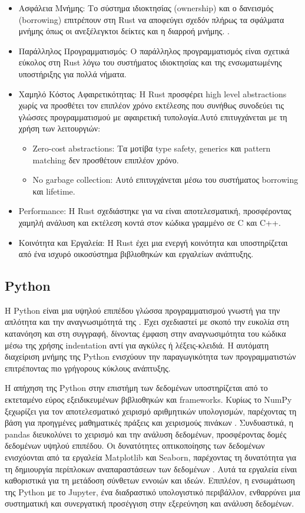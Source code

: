 \begin{itemize}
\item Ασφάλεια Μνήμης: Το σύστημα ιδιοκτησίας (ownership) και ο δανεισμός (borrowing) επιτρέπουν στη Rust να αποφεύγει σχεδόν πλήρως τα σφάλματα μνήμης όπως οι ανεξέλεγκτοι δείκτες και η διαρροή μνήμης. \cite{rust1}.
\item Παράλληλος Προγραμματισμός: Ο παράλληλος προγραμματισμός είναι σχετικά εύκολος στη Rust λόγω του συστήματος ιδιοκτησίας και της ενσωματωμένης υποστήριξης για πολλά νήματα.
\item Χαμηλό Κόστος Αφαιρετικότητας: Η Rust προσφέρει high level abstractions χωρίς να προσθέτει τον επιπλέον χρόνο εκτέλεσης που συνήθως συνοδεύει τις γλώσσες προγραμματισμού με αφαιρετική τυπολογία.Αυτό επιτυγχάνεται με τη χρήση των λειτουργιών:
\begin{itemize}
    \item Zero-cost abstractions: Τα μοτίβα type safety, generics και pattern matching δεν προσθέτουν επιπλέον χρόνο.
    \item No garbage collection: Αυτό επιτυγχάνεται μέσω του συστήματος borrowing και lifetime.
\end{itemize}
\item Performance: Η Rust σχεδιάστηκε για να είναι αποτελεσματική, προσφέροντας χαμηλή ανάλυση και εκτέλεση κοντά στον κώδικα γραμμένο σε C και C++.
\item Κοινότητα και Εργαλεία: Η Rust έχει μια ενεργή κοινότητα και υποστηρίζεται από ένα ισχυρό οικοσύστημα βιβλιοθηκών και εργαλείων ανάπτυξης.
\end{itemize}

\subsection{Python}
\label{subsec:python}

Η Python είναι μια υψηλού επιπέδου γλώσσα προγραμματισμού γνωστή για την απλότητα και την αναγνωσιμότητά της \cite{python1}. Έχει σχεδιαστεί με σκοπό την ευκολία στη κατανόηση και στη συγγραφή, δίνοντας έμφαση στην αναγνωσιμότητα του κώδικα μέσω της χρήσης indentation αντί για αγκύλες ή λέξεις-κλειδιά. H αυτόματη διαχείριση μνήμης της Python ενισχύουν την παραγωγικότητα των προγραμματιστών επιτρέποντας πιο γρήγορους κύκλους ανάπτυξης.

Η απήχηση της Python στην επιστήμη των δεδομένων υποστηρίζεται από το εκτεταμένο εύρος εξειδικευμένων βιβλιοθηκών και frameworks. Κυρίως το NumPy ξεχωρίζει για τον αποτελεσματικό χειρισμό αριθμητικών υπολογισμών, παρέχοντας τη βάση για προηγμένες μαθηματικές πράξεις και χειρισμούς πινάκων \cite{python2}. Συνδυαστικά, η pandas διευκολύνει το χειρισμό και την ανάλυση δεδομένων, προσφέροντας δομές δεδομένων υψηλού επιπέδου. Οι δυνατότητες οπτικοποίησης των δεδομένων ενισχύονται από τα εργαλεία Matplotlib και Seaborn, παρέχοντας τη δυνατότητα για τη δημιουργία περίπλοκων αναπαραστάσεων των δεδομένων \cite{python2}. Αυτά τα εργαλεία είναι καθοριστικά για τη μετάδοση σύνθετων εννοιών και ιδεών. Επιπλέον, η ενσωμάτωση της Python με το Jupyter, ένα διαδραστικό υπολογιστικό περιβάλλον, ενθαρρύνει μια συστηματική και συνεργατική προσέγγιση στην εξερεύνηση και ανάλυση δεδομένων. 

